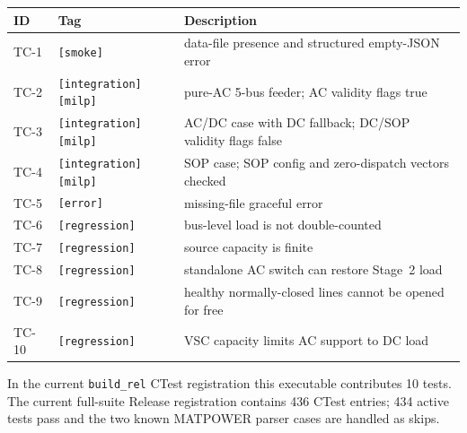 \begin{center}
\begin{tabular}{llL{7cm}}
\hline
ID & Tag & Description \\
\hline
TC-1 & \texttt{[smoke]} & data-file presence and structured empty-JSON error \\
TC-2 & \texttt{[integration][milp]} & pure-AC 5-bus feeder; AC validity flags true \\
TC-3 & \texttt{[integration][milp]} & AC/DC case with DC fallback; DC/SOP validity flags false \\
TC-4 & \texttt{[integration][milp]} & SOP case; SOP config and zero-dispatch vectors checked \\
TC-5 & \texttt{[error]} & missing-file graceful error \\
TC-6 & \texttt{[regression]} & bus-level load is not double-counted \\
TC-7 & \texttt{[regression]} & source capacity is finite \\
TC-8 & \texttt{[regression]} & standalone AC switch can restore Stage~2 load \\
TC-9 & \texttt{[regression]} & healthy normally-closed lines cannot be opened for free \\
TC-10 & \texttt{[regression]} & VSC capacity limits AC support to DC load \\
\hline
\end{tabular}
\end{center}

In the current \texttt{build\_rel} CTest registration this executable contributes
10 tests.  The current full-suite Release registration contains 436 CTest
entries; 434 active tests pass and the two known MATPOWER parser cases are
handled as skips.
